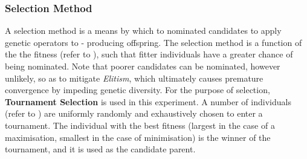 \documentclass[a4paper,12pt]{article}
\begin{document}
        \subsubsection*{Selection Method} \label{subsubsec:selection}
            \par{
                A selection method is a means by which to nominated candidates to apply genetic operators to - producing offspring. The selection method is a function of the the fitness (refer to ),
                such that fitter individuals have a greater chance of being nominated. Note that poorer candidates can be nominated, however unlikely, so as to mitigate \textit{Elitism}, which ultimately
                causes premature convergence by impeding genetic diversity.\newline 
                \newline 
                For the purpose of selection, \textbf{Tournament Selection} is used in this experiment. A number of individuals (refer to ) are uniformly randomly and exhaustively chosen to enter a 
                tournament. The individual with the best fitness (largest in the case of a maximisation, smallest in the case of minimisation) is the winner of the tournament, and it is used as the candidate parent. 
            }
        \newpage
\end{document}
